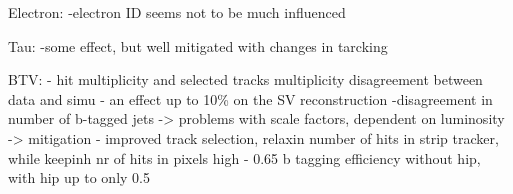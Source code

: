 Electron:
-electron ID seems not to be much influenced

Tau:
-some effect, but well mitigated with changes in tarcking

BTV:
- hit multiplicity and selected tracks multiplicity disagreement between data and simu
- an effect up to 10\% on the SV reconstruction
-disagreement in number of b-tagged jets
-> problems with scale factors, dependent on luminosity
-> mitigation - improved track selection, relaxin  number of hits in strip tracker, while keepinh nr of hits in pixels high
- 0.65 b tagging efficiency without hip, with hip up to only 0.5

